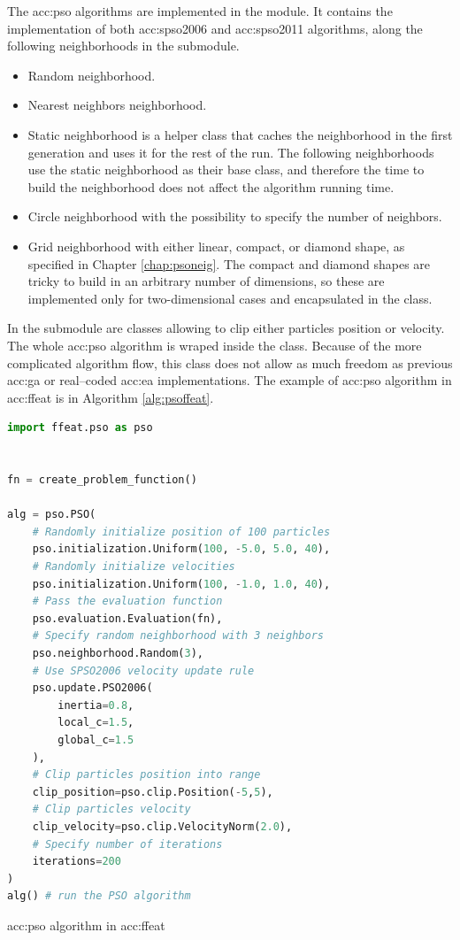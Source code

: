 The \acrlong{acc:pso} algorithms are implemented in the  module. It contains the implementation of both \acrshort{acc:spso2006} and \acrshort{acc:spso2011} algorithms, along the following neighborhoods in the  submodule.
\begin{itemize}
    \item Random neighborhood.
    \item Nearest neighbors neighborhood.
    \item Static neighborhood is a helper class that caches the neighborhood in the first generation and uses it for the rest of the run. The following neighborhoods use the static neighborhood as their base class, and therefore the time to build the neighborhood does not affect the algorithm running time.
    \item Circle neighborhood with the possibility to specify the number of neighbors.
    \item Grid neighborhood with either linear, compact, or diamond shape, as specified in Chapter \ref{chap:psoneig}. The compact and diamond shapes are tricky to build in an arbitrary number of dimensions, so these are implemented only for two-dimensional cases and encapsulated in the  class.
\end{itemize}

In the  submodule are classes allowing to clip either particles position or velocity. The whole \acrshort{acc:pso} algorithm is wraped inside the  class. Because of the more complicated algorithm flow, this class does not allow as much freedom as previous \acrshort{acc:ga} or real--coded \acrshort{acc:ea} implementations. The example of \acrshort{acc:pso} algorithm in \acrshort{acc:ffeat} is in Algorithm \ref{alg:psoffeat}.

\begin{algorithm}[b!]
\begin{lstlisting}[language=Python, xrightmargin=18pt]
import ffeat.pso as pso


fn = create_problem_function()

alg = pso.PSO(
    # Randomly initialize position of 100 particles
    pso.initialization.Uniform(100, -5.0, 5.0, 40),
    # Randomly initialize velocities
    pso.initialization.Uniform(100, -1.0, 1.0, 40),
    # Pass the evaluation function
    pso.evaluation.Evaluation(fn),
    # Specify random neighborhood with 3 neighbors
    pso.neighborhood.Random(3),
    # Use SPSO2006 velocity update rule
    pso.update.PSO2006(
        inertia=0.8, 
        local_c=1.5, 
        global_c=1.5
    ),
    # Clip particles position into range
    clip_position=pso.clip.Position(-5,5),
    # Clip particles velocity
    clip_velocity=pso.clip.VelocityNorm(2.0),
    # Specify number of iterations
    iterations=200
)
alg() # run the PSO algorithm
\end{lstlisting}
\caption{\acrshort*{acc:pso} algorithm in \acrshort*{acc:ffeat}}
\label{alg:psoffeat}
\end{algorithm}
